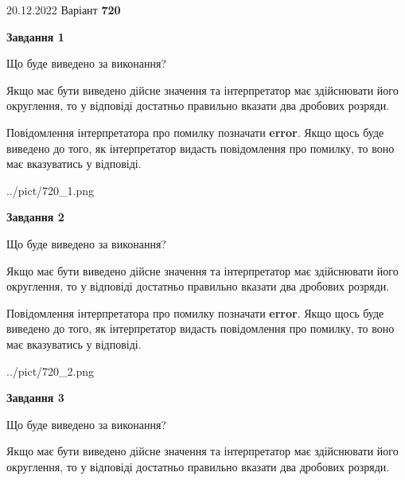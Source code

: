 \documentclass[12pt, ukrainian]{article}
\begin{document}
{20.12.2022 Варіант \No \textbf { 720 }\par}
{
\begin {Large}

{\begin {center}\textbf{Завдання 1}\end {center}}\par
Що буде виведено за виконання? \par

Якщо має бути виведено дійсне значення та інтерпретатор має здійснювати його округлення, 
то у відповіді достатньо правильно вказати два дробових розряди.

Повідомлення інтерпретатора про помилку позначати \textbf{error}.
Якщо щось буде виведено до того, як інтерпретатор видасть повідомлення про помилку, 
то воно має вказуватись у відповіді. \par

\begin{center}
	{../pict/720_1.png}
\end{center}
\newpage

{\begin {center}\textbf{Завдання 2}\end {center}}\par
Що буде виведено за виконання? \par

Якщо має бути виведено дійсне значення та інтерпретатор має здійснювати його округлення, 
то у відповіді достатньо правильно вказати два дробових розряди.

Повідомлення інтерпретатора про помилку позначати \textbf{error}.
Якщо щось буде виведено до того, як інтерпретатор видасть повідомлення про помилку, 
то воно має вказуватись у відповіді. \par

\begin{center}
	{../pict/720_2.png}
\end{center}
\newpage

{\begin {center}\textbf{Завдання 3}\end {center}}\par
Що буде виведено за виконання? \par

Якщо має бути виведено дійсне значення та інтерпретатор має здійснювати його округлення, 
то у відповіді достатньо правильно вказати два дробових розряди.


\end{Large}}
\end{document}
